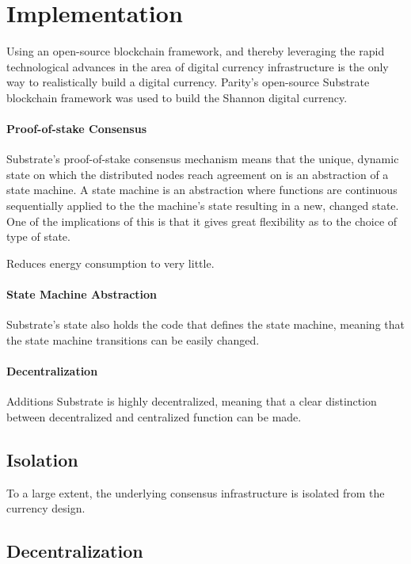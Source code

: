 \chapter{Implementation}
\label{chapter:implementation}

Using an open-source blockchain framework, and thereby leveraging the rapid technological advances
in the area of digital currency infrastructure is the only way to realistically build a digital
currency. Parity's open-source Substrate blockchain framework was used to build the Shannon digital
currency.

\subsubsection{Proof-of-stake Consensus}

Substrate's proof-of-stake consensus mechanism means that the unique, dynamic state on which the
distributed nodes reach agreement on is an abstraction of a state machine. A state machine is an
abstraction where functions are continuous sequentially applied to the the machine's state resulting
in a new, changed state. One of the implications of this is that it gives great flexibility as to
the choice of type of state.

Reduces energy consumption to very little.

\subsubsection{State Machine Abstraction}

Substrate's state also holds the code that defines the state machine, meaning that the state machine
transitions can be easily changed.

\subsubsection{Decentralization}

Additions Substrate is highly decentralized, meaning that a clear distinction between decentralized
and centralized function can be made.

\section{Isolation}

To a large extent, the underlying consensus infrastructure is isolated from the currency design. 

\section{Decentralization}

